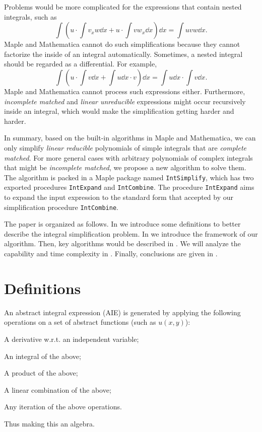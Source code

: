 Problems would be more complicated for the expressions that contain nested integrals, such as 
\begin{equation}
\int\!{\left(u\cdot\int\!{v_xw\dd x}+u\cdot\int\!{vw_x\dd x}\right)\dd x}=\int\!{uvw\dd x}.
\label{nested_integral}
\end{equation}
Maple and Mathematica cannot do such simplifications because they cannot factorize the inside of an integral automatically. Sometimes, a nested integral should be regarded as  a differential. For example,
\begin{equation}
\int\!{\left(u\cdot\int\!{v\dd x}+\int\!{u\dd x}\cdot v\right)\dd x}=\int\!{u\dd x}\cdot\int\!{v\dd x}.
\label{integral_as_differential}
\end{equation}
Maple and Mathematica cannot process such expressions either. Furthermore, \emph{incomplete matched} and \emph{linear unreducible} expressions might occur recursively inside an integral, which would make the simplification getting harder and harder.

In summary, based on the built-in algorithms in Maple and Mathematica, we can only simplify \emph{linear reducible} polynomials of simple integrals that are \emph{complete matched}. For more general cases with arbitrary polynomials of complex integrals that might be \emph{incomplete matched}, we propose a new algorithm to solve them. The algorithm is packed in a Maple package named \verb|IntSimplify|, which has two exported procedures \verb|IntExpand|  and \texttt{IntCombine}. The procedure \verb|IntExpand| aims to expand the input expression to the standard form that accepted by our simplification procedure \texttt{IntCombine}. 

The paper is organized as follows. In  we introduce some definitions to better describe the integral simplification problem. In  we introduce the framework of our algorithm. Then, key algorithms would be described in . We will analyze the capability and time complexity in . Finally, conclusions are given in .

\section{Definitions}\label{Definitions-03}
An abstract integral expression (AIE) is generated by applying the following operations on a set of abstract functions (such as $u(x,y)$):
\begin{compactenum}[(1) ]
\item A derivative w.r.t. an independent variable;
\item An integral of the above;
\item A product of the above;
\item A linear combination of the above;
\item Any iteration of the above operations.
\end{compactenum}
Thus making this an algebra.

